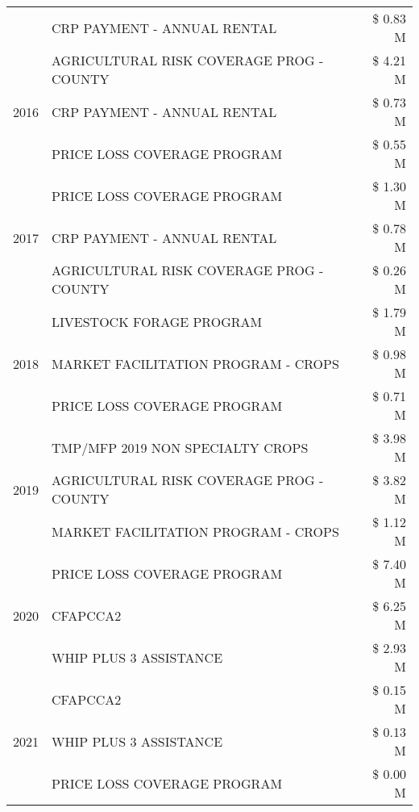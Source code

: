 \begin{tabular}{llr}
 & CRP PAYMENT - ANNUAL RENTAL & \$ 0.83 M \\
\cline{1-3}
\multirow[t]{3}{*}{2016} & AGRICULTURAL RISK COVERAGE PROG - COUNTY & \$ 4.21 M \\
 & CRP PAYMENT - ANNUAL RENTAL & \$ 0.73 M \\
 & PRICE LOSS COVERAGE PROGRAM & \$ 0.55 M \\
\cline{1-3}
\multirow[t]{3}{*}{2017} & PRICE LOSS COVERAGE PROGRAM & \$ 1.30 M \\
 & CRP PAYMENT - ANNUAL RENTAL & \$ 0.78 M \\
 & AGRICULTURAL RISK COVERAGE PROG - COUNTY & \$ 0.26 M \\
\cline{1-3}
\multirow[t]{3}{*}{2018} & LIVESTOCK FORAGE PROGRAM & \$ 1.79 M \\
 & MARKET FACILITATION PROGRAM - CROPS & \$ 0.98 M \\
 & PRICE LOSS COVERAGE PROGRAM & \$ 0.71 M \\
\cline{1-3}
\multirow[t]{3}{*}{2019} & TMP/MFP 2019 NON SPECIALTY CROPS & \$ 3.98 M \\
 & AGRICULTURAL RISK COVERAGE PROG - COUNTY & \$ 3.82 M \\
 & MARKET FACILITATION PROGRAM - CROPS & \$ 1.12 M \\
\cline{1-3}
\multirow[t]{3}{*}{2020} & PRICE LOSS COVERAGE PROGRAM & \$ 7.40 M \\
 & CFAPCCA2 & \$ 6.25 M \\
 & WHIP PLUS 3 ASSISTANCE & \$ 2.93 M \\
\cline{1-3}
\multirow[t]{3}{*}{2021} & CFAPCCA2 & \$ 0.15 M \\
 & WHIP PLUS 3 ASSISTANCE & \$ 0.13 M \\
 & PRICE LOSS COVERAGE PROGRAM & \$ 0.00 M \\
\cline{1-3}
\bottomrule
\end{tabular}

